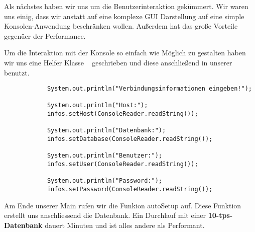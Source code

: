 Als nächstes haben wir uns um die Benutzerinteraktion gekümmert. Wir waren uns
einig, dass wir anstatt auf eine komplexe GUI Darstellung auf eine simple
Konsolen-Anwendung beschränken wollen. Außerdem hat das große Vorteile gegenüer
der Performance.

Um die Interaktion mit der Konsole so einfach wie Möglich zu gestalten haben wir
uns eine Helfer Klasse ~ geschrieben und diese anschließend
in unserer  benutzt.

\begin{lstlisting}
			System.out.println("Verbindungsinformationen eingeben!");
			
			System.out.println("Host:");
			infos.setHost(ConsoleReader.readString());

			System.out.println("Datenbank:");
			infos.setDatabase(ConsoleReader.readString());
			
			System.out.println("Benutzer:");
			infos.setUser(ConsoleReader.readString());
			
			System.out.println("Password:");
			infos.setPassword(ConsoleReader.readString());
\end{lstlisting}

Am Ende unserer Main rufen wir die Funkion autoSetup auf. Diese Funktion 
erstellt uns anschliessend die Datenbank. Ein Durchlauf mit einer
\textbf{10-tps-Datenbank} dauert  Minuten und ist alles andere als
Performant.
\clearpage
